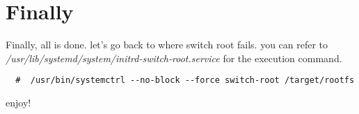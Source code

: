 \section{Finally}
Finally,  all is done. let's go back to where switch root fails. you can refer to \emph{/usr/lib/systemd/system/initrd-switch-root.service} for the execution command. 
\begin{lstlisting}
  #  /usr/bin/systemctrl --no-block --force switch-root /target/rootfs
\end{lstlisting}

enjoy! 
\cleardoublepage

